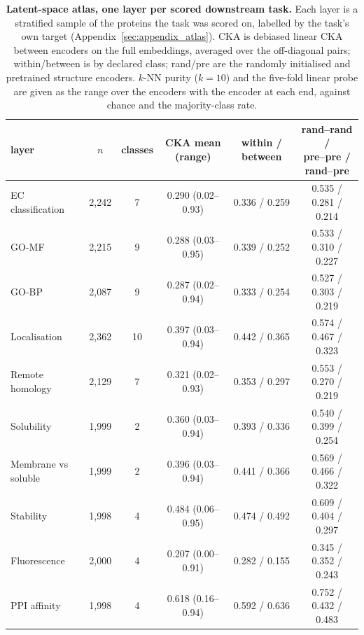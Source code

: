 \begin{table}[!htbp]
\centering
\small
\caption{\textbf{Latent-space atlas, one layer per scored downstream task.} Each layer is a stratified sample of the proteins the task was scored on, labelled by the task's own target (Appendix~\ref{sec:appendix_atlas}). CKA is debiased linear CKA between encoders on the full embeddings, averaged over the off-diagonal pairs; within/between is by declared class; rand/pre are the randomly initialised and pretrained structure encoders. $k$-NN purity ($k=10$) and the five-fold linear probe are given as the range over the encoders with the encoder at each end, against chance and the majority-class rate.}
\label{tab:atlas_summary}

\setlength{\tabcolsep}{3pt}
\begin{adjustbox}{max width=\linewidth}
\begin{tabular}{lccccc}
\toprule
\rowcolor{CompassLavender!32}
layer & $n$ & classes & CKA mean (range) & within / between & \makecell{rand--rand /\\pre--pre /\\rand--pre} \\
\midrule
EC classification & 2,242 & 7 & 0.290 (0.02--0.93) & 0.336 / 0.259 & 0.535 / 0.281 / 0.214 \\
GO-MF & 2,215 & 9 & 0.288 (0.03--0.95) & 0.339 / 0.252 & 0.533 / 0.310 / 0.227 \\
GO-BP & 2,087 & 9 & 0.287 (0.02--0.94) & 0.333 / 0.254 & 0.527 / 0.303 / 0.219 \\
Localisation & 2,362 & 10 & 0.397 (0.03--0.94) & 0.442 / 0.365 & 0.574 / 0.467 / 0.323 \\
Remote homology & 2,129 & 7 & 0.321 (0.02--0.93) & 0.353 / 0.297 & 0.553 / 0.270 / 0.219 \\
Solubility & 1,999 & 2 & 0.360 (0.03--0.94) & 0.393 / 0.336 & 0.540 / 0.399 / 0.254 \\
Membrane vs soluble & 1,999 & 2 & 0.396 (0.03--0.94) & 0.441 / 0.366 & 0.569 / 0.466 / 0.322 \\
Stability & 1,998 & 4 & 0.484 (0.06--0.95) & 0.474 / 0.492 & 0.609 / 0.404 / 0.297 \\
Fluorescence & 2,000 & 4 & 0.207 (0.00--0.91) & 0.282 / 0.155 & 0.345 / 0.352 / 0.243 \\
PPI affinity & 1,998 & 4 & 0.618 (0.16--0.94) & 0.592 / 0.636 & 0.752 / 0.432 / 0.483 \\
\bottomrule
\end{tabular}
\end{adjustbox}

\end{table}

